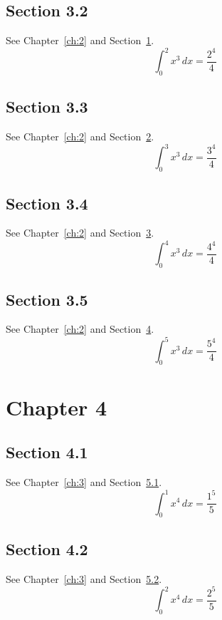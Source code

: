 \documentclass{book}
\begin{document}
\section{Section 3.2}\label{sec:3-2}
See Chapter~\ref{ch:2} and Section~\ref{sec:3-2}.
\lipsum[18-20]
\begin{equation}\label{eq:3-2} \int_0^{2} x^{3}\,dx = \frac{2^{4}}{4}\end{equation}
\section{Section 3.3}\label{sec:3-3}
See Chapter~\ref{ch:2} and Section~\ref{sec:3-3}.
\lipsum[19-21]
\begin{equation}\label{eq:3-3} \int_0^{3} x^{3}\,dx = \frac{3^{4}}{4}\end{equation}
\section{Section 3.4}\label{sec:3-4}
See Chapter~\ref{ch:2} and Section~\ref{sec:3-4}.
\lipsum[20-22]
\begin{equation}\label{eq:3-4} \int_0^{4} x^{3}\,dx = \frac{4^{4}}{4}\end{equation}
\section{Section 3.5}\label{sec:3-5}
See Chapter~\ref{ch:2} and Section~\ref{sec:3-5}.
\lipsum[21-23]
\begin{equation}\label{eq:3-5} \int_0^{5} x^{3}\,dx = \frac{5^{4}}{4}\end{equation}
\chapter{Chapter 4}\label{ch:4}
\section{Section 4.1}\label{sec:4-1}
See Chapter~\ref{ch:3} and Section~\ref{sec:4-1}.
\lipsum[22-24]
\begin{equation}\label{eq:4-1} \int_0^{1} x^{4}\,dx = \frac{1^{5}}{5}\end{equation}
\section{Section 4.2}\label{sec:4-2}
See Chapter~\ref{ch:3} and Section~\ref{sec:4-2}.
\lipsum[23-25]
\begin{equation}\label{eq:4-2} \int_0^{2} x^{4}\,dx = \frac{2^{5}}{5}\end{equation}
\end{document}
